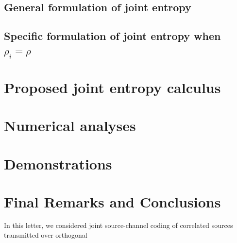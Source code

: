 \documentclass[journal]{IEEEtran}
\begin{document}
\subsection{General formulation of joint entropy}
\subsection{Specific formulation of joint entropy when $\rho_i=\rho$}
\section{Proposed joint entropy calculus } \label{sec:NewJoint}

\section{Numerical analyses } \label{sec:Test}

\section{Demonstrations } \label{sec:Appendix}

\section{Final Remarks and Conclusions} 
\label{sec:Conclusions}
In this letter, we considered joint source-channel coding of correlated
sources transmitted over orthogonal

\end{document}
